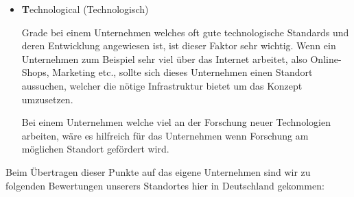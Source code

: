 \begin{itemize}
                \item \textbf Technological (Technologisch)
                
                    Grade bei einem Unternehmen welches oft gute technologische Standards und deren Entwicklung angewiesen 
                    ist, ist dieser Faktor sehr wichtig. Wenn ein Unternehmen zum Beispiel sehr viel über das Internet 
                    arbeitet, also Online-Shops, Marketing etc., sollte sich dieses Unternehmen einen Standort aussuchen,
                    welcher die nötige Infrastruktur bietet um das Konzept umzusetzen.
    
                    Bei einem Unternehmen welche viel an der Forschung neuer Technologien arbeiten, wäre es hilfreich für 
                    das Unternehmen wenn Forschung am möglichen Standort gefördert wird.
            \end{itemize}
    
        Beim Übertragen dieser Punkte auf das eigene Unternehmen sind wir zu folgenden Bewertungen unserers Standortes hier
        in Deutschland gekommen:
    
